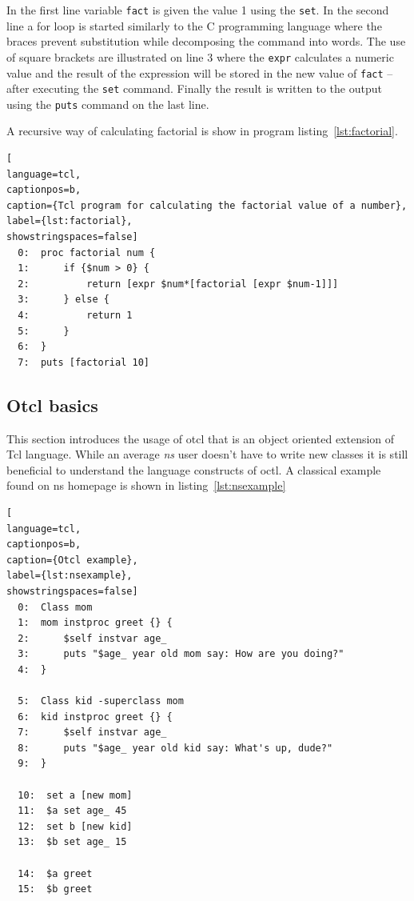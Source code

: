\documentclass[a4paper]{article}
\begin{document}
In the first line variable \verb!fact! is given the value 1 using the \verb!set!. In the second
line a for loop is started similarly to the C programming language where the braces prevent substitution while
decomposing the command into words. The use of square brackets are illustrated on line 3 where the
\verb!expr! calculates a numeric value and the result of the expression will be stored in the new value of
\verb!fact! -- after executing the \verb!set! command. Finally the result is written to the
output using the \verb!puts! command on the last line.

A recursive way of calculating factorial is show in program listing~\ref{lst:factorial}.

\begin{lstlisting}[
language=tcl,
captionpos=b,
caption={Tcl program for calculating the factorial value of a number},
label={lst:factorial},
showstringspaces=false]
  0:  proc factorial num {
  1:      if {$num > 0} {
  2:          return [expr $num*[factorial [expr $num-1]]]
  3:      } else {
  4:          return 1
  5:      }
  6:  }
  7:  puts [factorial 10]
\end{lstlisting}

\subsection{Otcl basics}

This section introduces the usage of otcl that is an object oriented extension of Tcl language. While an average
\emph{ns} user doesn't have to write new classes it is still beneficial to understand the language constructs of octl.
A classical example found on ns homepage is shown in listing~\ref{lst:nsexample}

\begin{lstlisting}[
language=tcl,
captionpos=b,
caption={Otcl example},
label={lst:nsexample},
showstringspaces=false]
  0:  Class mom
  1:  mom instproc greet {} {
  2:      $self instvar age_
  3:      puts "$age_ year old mom say: How are you doing?"
  4:  }

  5:  Class kid -superclass mom
  6:  kid instproc greet {} {
  7:      $self instvar age_
  8:      puts "$age_ year old kid say: What's up, dude?"
  9:  }

  10:  set a [new mom]
  11:  $a set age_ 45
  12:  set b [new kid]
  13:  $b set age_ 15

  14:  $a greet
  15:  $b greet
\end{lstlisting}
\end{document}

